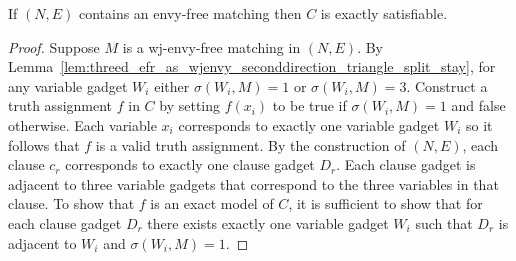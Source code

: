 \begin{lem}
\label{lem:threed_efr_as_wjenvy_seconddirection}
If $(N, E)$ contains an envy-free matching then $C$ is exactly satisfiable.
\end{lem}
\begin{proof}
Suppose $M$ is a wj-envy-free matching in $(N, E)$. By Lemma~\ref{lem:threed_efr_as_wjenvy_seconddirection_triangle_split_stay}, for any variable gadget $W_i$ either $\sigma(W_i, M)=1$ or $\sigma(W_i, M)=3$. Construct a truth assignment $f$ in $C$ by setting $f(x_i)$ to be true if $\sigma(W_i, M)=1$ and false otherwise. Each variable $x_i$ corresponds to exactly one variable gadget $W_i$ so it follows that $f$ is a valid truth assignment. By the construction of $(N, E)$, each clause $c_r$ corresponds to exactly one clause gadget $D_r$. Each clause gadget is adjacent to three variable gadgets that correspond to the three variables in that clause. To show that $f$ is an exact model of $C$, it is sufficient to show that for each clause gadget $D_r$ there exists exactly one variable gadget $W_i$ such that $D_r$ is adjacent to $W_i$ and $\sigma(W_i, M)=1$.


\end{proof}
